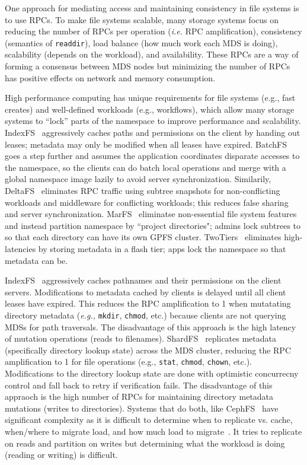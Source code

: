 \documentclass[conference]{acm_proc_article-sp} \usepackage[english]{babel}
\begin{document}
One approach for mediating access and maintaining consistency in file systems
is to use RPCs. To make file systems scalable, many storage systems focus on
reducing the number of RPCs per operation ({\it i.e.} RPC amplification),
consistency (semantics of \texttt{readdir}), load balance (how much work each
MDS is doing), scalability (depends on the workload), and availability. These
RPCs are a way of forming a consensus between MDS nodes but minimizing the
number of RPCs has positive effects on network and memory consumption.

High performance computing has unique requirements for file systems ({e.g.}, fast creates) and well-defined workloads (e.g., workflows), which allow many storage systems to ``lock'' parts of the namespace to improve performance and scalability. IndexFS~\cite{} aggressively caches paths and permissions on the client by handing out leases; metadata may only be modified when all leases have expired. BatchFS~\cite{} goes a step further and assumes the application coordinates disparate accesses to the namespace, so the clients can do batch local operations and merge with a global namespace image lazily to avoid server synchronization. Similarily, DeltaFS~\cite{} eliminates RPC traffic using subtree snapshots for non-conflicting workloads and middleware for conflicting workloads; this reduces false sharing and server synchronization. MarFS~\cite{} eliminatse non-essential file system features and instead partition namespace by ``project directories"; admins lock subtrees to so that each directory can have its own GPFS cluster. TwoTiers~\cite{} eliminates high-latencies by storing metadata in a flash tier; apps lock the namespace so that metadata can be. 

IndexFS~\cite{ren:sc2014-indexfs} aggressively caches pathnames and their
permissions on the client servers. Modifications to metadata cached by clients
is delayed until all client leases have expired. This reduces the RPC
amplification to 1 when mutatating directory metadata ({\it e.g.,}
\texttt{mkdir}, \texttt{chmod}, etc.) because clients are not querying MDSs for
path traversals. The disadvantage of this approach is the high latency of
mutation operations (reads to filenames).  ShardFS~\cite{xiao:socc2015-shardfs}
replicates metadata (specifically directory lookup state) across the MDS
cluster, reducing the RPC amplification to 1 for file operations ({e.g.,}
\texttt{stat}, \texttt{chmod}, \texttt{chown}, etc.). Modifications to the
directory lookup state are done with optimistic concurrecny control and fall
back to retry if verification fails. The disadvantage of this appraoch is the
high number of RPCs for maintaining directory metadata mutations (writes to
directories).  Systems that do both, like
CephFS~\cite{weil:sc2004-dyn-metadata, weil:osdi2006-ceph} have significant
complexity as it is difficult to determine when to replicate vs. cache,
when/where to migrate load, and how much load to
migrate~\cite{sevilla:sc2015-mantle}. It tries to replicate on reads and
partition on writes but determining what the workload is doing (reading or
writing) is difficult.
\end{document}
